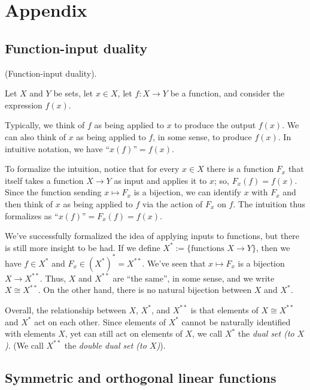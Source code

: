 \chapter{Appendix}

\section*{Function-input duality}

\begin{deriv}
\label{ch::appendix::deriv::function_input_duality}
    (Function-input duality).
    
    Let $X$ and $Y$ be sets, let $x \in X$, let $f:X \rightarrow Y$ be a function, and consider the expression $f(x)$.

    Typically, we think of $f$ as being applied to $x$ to produce the output $f(x)$. We can also think of $x$ as being applied to $f$, in some sense, to produce $f(x)$. In intuitive notation, we have $\text{``}x(f)\text{''} = f(x)$.

    To formalize the intuition, notice that for every $x \in X$ there is a function $F_x$ that itself takes a function $X \rightarrow Y$ as input and applies it to $x$; so, $F_x(f) = f(x)$. Since the function sending $x \mapsto F_x$ is a bijection, we can identify $x$ with $F_x$ and then think of $x$ as being applied to $f$ via the action of $F_x$ on $f$. The intuition thus formalizes as $\text{``}x(f)\text{''} = F_x(f) = f(x)$.

    We've successfully formalized the idea of applying inputs to functions, but there is still more insight to be had. If we define $X^* := \{\text{functions $X \rightarrow Y$}\}$, then we have $f \in X^*$ and $F_x \in (X^*)^* = X^{**}$. We've seen that $x \mapsto F_x$ is a bijection $X \rightarrow X^{**}$. Thus, $X$ and $X^{**}$ are ``the same'', in some sense, and we write $X \cong X^{**}$. On the other hand, there is no natural bijection between $X$ and $X^*$.

    Overall, the relationship between $X$, $X^*$, and $X^{**}$ is that elements of $X \cong X^{**}$ and $X^*$ act on each other. Since elements of $X^*$ cannot be naturally identified with elements $X$, yet can still act on elements of $X$, we call $X^*$ the \textit{dual set (to $X$)}. (We call $X^{**}$ the \textit{double dual set (to $X$)}).
\end{deriv}

\section*{Symmetric and orthogonal linear functions}

